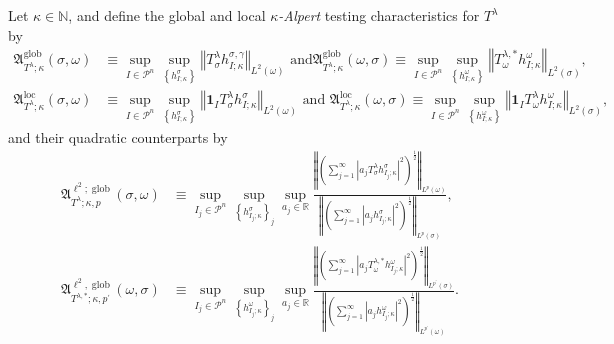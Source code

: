 \documentclass{amsart}%
\theoremstyle{plain}
\numberwithin{equation}{section}
\begin{document}
Let $\kappa\in\mathbb{N}$,
and define the global and local $\kappa$\emph{-Alpert} testing characteristics
for $T^{\lambda}$ by%
\begin{align*}
\mathfrak{A}_{T^{\lambda};\kappa}^{\operatorname*{glob}}\left(  \sigma
,\omega\right)   &  \equiv\sup_{I\in\mathcal{P}^{n}} \sup\limits_{\left\{
h_{I; \kappa}^{\sigma} \right\}  }\left\Vert T_{\sigma}^{\lambda}h_{I;\kappa
}^{\sigma,\gamma}\right\Vert _{L^{2}\left(  \omega\right)  }\text{ and
}\mathfrak{A}_{T^{\lambda};\kappa}^{\operatorname*{glob}}\left(  \omega
,\sigma\right)  \equiv\sup_{I\in\mathcal{P}^{n} } \sup\limits_{\left\{  h_{I;
\kappa}^{\omega} \right\}  } \left\Vert T_{\omega}^{\lambda,\ast}h_{I;\kappa
}^{\omega}\right\Vert _{L^{2}\left(  \sigma\right)  },\\
\mathfrak{A}_{T^{\lambda};\kappa}^{\operatorname{loc}}\left(  \sigma
,\omega\right)   &  \equiv\sup_{I\in\mathcal{P}^{n}} \sup\limits_{\left\{
h_{I; \kappa}^{\sigma} \right\}  } \left\Vert \mathbf{1}_{I}T_{\sigma
}^{\lambda}h_{I;\kappa}^{\sigma}\right\Vert _{L^{2}\left(  \omega\right)
}\text{ and }\mathfrak{A}_{T^{\lambda};\kappa}^{\operatorname{loc}}\left(
\omega,\sigma\right)  \equiv\sup_{I\in\mathcal{P}^{n}} \sup\limits_{\left\{
h_{I; \kappa}^{\omega} \right\}  } \left\Vert \mathbf{1}_{I}T_{\omega
}^{\lambda}h_{I;\kappa}^{\omega}\right\Vert _{L^{2}\left(  \sigma\right)  },
\end{align*}
and their quadratic counterparts by%
\begin{align*}
\mathfrak{A}_{T^{\lambda};\kappa,p}^{\ell^{2};\operatorname*{glob}}\left(
\sigma,\omega\right)   &  \equiv\sup_{I_{j}\in\mathcal{P}^{n} } \sup
\limits_{\left\{  h_{I_{j} ; \kappa}^{\sigma} \right\} _{j} } \sup_{a_{j}%
\in\mathbb{R}}\frac{\left\Vert \left(  \sum_{j=1}^{\infty}\left\vert
a_{j}T_{\sigma}^{\lambda}h_{I_{j};\kappa}^{\sigma}\right\vert ^{2}\right)
^{\frac{1}{2}}\right\Vert _{L^{p}\left(  \omega\right)  }}{\left\Vert \left(
\sum_{j=1}^{\infty}\left\vert a_{j}h_{I_{j};\kappa}^{\sigma}\right\vert
^{2}\right)  ^{\frac{1}{2}}\right\Vert _{L^{p}\left(  \sigma\right)  }},\\
\mathfrak{A}_{T^{\lambda,\ast};\kappa,p^{\prime}}^{\ell^{2}%
,\operatorname*{glob}}\left(  \omega,\sigma\right)   &  \equiv\sup_{I_{j}%
\in\mathcal{P}^{n}} \sup\limits_{\left\{  h_{I_{j} ; \kappa}^{\omega} \right\}
_{j} }\sup_{a_{j}\in\mathbb{R}}\frac{\left\Vert \left(  \sum_{j=1}^{\infty
}\left\vert a_{j}T_{\omega}^{\lambda,\ast}h_{I_{j};\kappa}^{\omega}\right\vert
^{2}\right)  ^{\frac{1}{2}}\right\Vert _{L^{p^{\prime}}\left(  \sigma\right)
}}{\left\Vert \left(  \sum_{j=1}^{\infty}\left\vert a_{j}h_{I_{j};\kappa
}^{\omega}\right\vert ^{2}\right)  ^{\frac{1}{2}}\right\Vert _{L^{p^{\prime}%
}\left(  \omega\right)  }}.
\end{align*}
\end{document}
